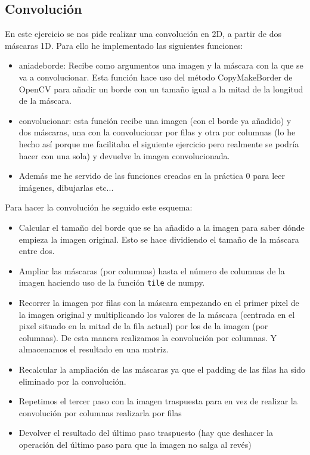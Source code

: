 \documentclass[12pt,spanish]{article}
\begin{document}
\subsection{Convolución}
En este ejercicio se nos pide realizar una convolución en 2D, a partir de dos máscaras 1D. Para ello he implementado las siguientes funciones:

\begin{itemize}
	\item aniadeborde: Recibe como argumentos una imagen y la máscara con la que se va a convolucionar. Esta función hace uso del método CopyMakeBorder de OpenCV para añadir un borde con un tamaño igual a la mitad de la longitud de la máscara.
	\item convolucionar: esta función recibe una imagen (con el borde ya añadido) y dos máscaras, una con la convolucionar por filas y otra por columnas (lo he hecho así porque me facilitaba el siguiente ejercicio pero realmente se podría hacer con una sola) y devuelve la imagen convolucionada.
	\item Además me he servido de las funciones creadas en la práctica 0 para leer imágenes, dibujarlas etc...
\end{itemize}

Para hacer la convolución he seguido este esquema:

\begin{itemize}
	\item Calcular el tamaño del borde que se ha añadido a la imagen para saber dónde empieza la imagen original. Esto se hace dividiendo el tamaño de la máscara entre dos.
	\item Ampliar las máscaras (por columnas) hasta el número de columnas de la imagen haciendo uso de la función \texttt{tile} de numpy. 
	\item Recorrer la imagen por filas con la máscara empezando en el primer pixel de la imagen original y multiplicando los valores de la máscara (centrada en el pixel situado en la mitad de la fila actual) por los de la imagen (por columnas). De esta manera realizamos la convolución por columnas. Y almacenamos el resultado en una matriz.
	\item Recalcular la ampliación de las máscaras ya que el padding de las filas ha sido eliminado por la convolución.
	\item Repetimos el tercer paso con la imagen traspuesta para en vez de realizar la convolución por columnas realizarla por filas
	\item Devolver el resultado del último paso traspuesto (hay que deshacer la operación del último paso para que la imagen no salga al revés)
\end{itemize}
\end{document}
